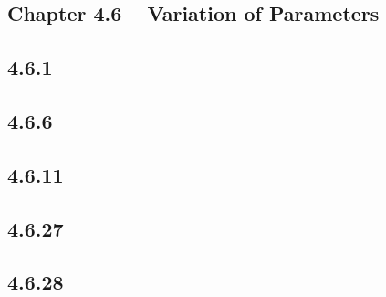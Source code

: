 \documentclass{article}
\begin{document}
\subsection{Chapter 4.6 -- Variation of Parameters}

\subsection{4.6.1}


\subsection{4.6.6}
\subsection{4.6.11}
\subsection{4.6.27}
\subsection{4.6.28}
\end{document}
